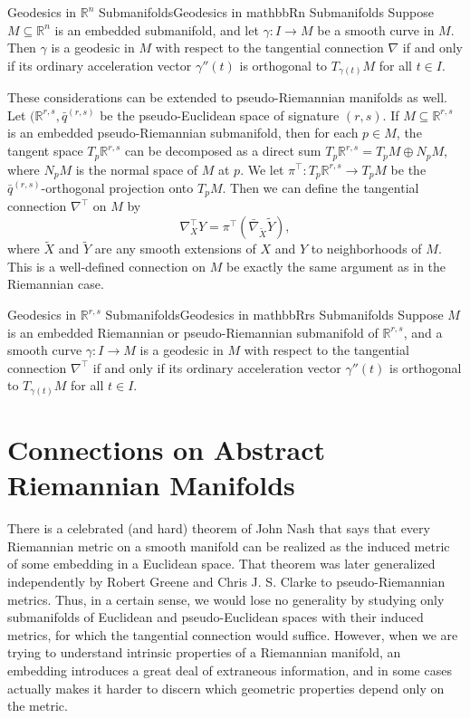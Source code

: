 \documentclass[../main.tex]{subfiles}
\begin{document}
\begin{proposition}{Geodesics in $\mathbb{R}^n$ Submanifolds}{Geodesics in mathbbRn Submanifolds}
	Suppose $M \subseteq \mathbb{R}^n$ is an embedded submanifold, and let $\gamma: I \to M$ be a smooth curve in $M$. Then $\gamma$ is a geodesic in $M$ with respect to the tangential connection $\nabla$ if and only if its ordinary acceleration vector $\gamma''(t)$ is orthogonal to $T_{\gamma(t)}M$ for all $t \in I$.
\end{proposition}

These considerations can be extended to pseudo-Riemannian manifolds as well. Let $(\mathbb{R}^{r,s}, \bar{q}^{(r,s)}$ be the pseudo-Euclidean space of signature $(r,s)$. If $M \subseteq \mathbb{R}^{r,s}$ is an embedded pseudo-Riemannian submanifold, then for each $p \in M$, the tangent space $T_p \mathbb{R}^{r,s}$ can be decomposed as a direct sum $T_p \mathbb{R}^{r,s} = T_p M \oplus N_p M$, where $N_p M$ is the normal space of $M$ at $p$. We let $\pi^\top: T_p \mathbb{R}^{r,s} \to T_p M$ be the $\bar{q}^{(r,s)}$-orthogonal projection onto $T_p M$. Then we can define the tangential connection $\nabla^{\top}$ on $M$ by
\begin{equation}
	\nabla^{\top}_X Y = \pi^\top(\bar{\nabla}_{\tilde{X}} \tilde{Y}),
\end{equation}
where $\tilde{X}$ and $\tilde{Y}$ are any smooth extensions of $X$ and $Y$ to neighborhoods of $M$. This is a well-defined connection on $M$ be exactly the same argument as in the Riemannian case.

\begin{proposition}{Geodesics in $\mathbb{R}^{r,s}$ Submanifolds}{Geodesics in mathbbRrs Submanifolds}
	Suppose $M$ is an embedded Riemannian or pseudo-Riemannian submanifold of $\mathbb{R}^{r,s}$, and a smooth curve $\gamma: I \to M$ is a geodesic in $M$ with respect to the tangential connection $\nabla^{\top}$ if and only if its ordinary acceleration vector $\gamma''(t)$ is orthogonal to $T_{\gamma(t)}M$ for all $t \in I$.
\end{proposition}

\section{Connections on Abstract Riemannian Manifolds}
\begin{remark}
	There is a celebrated (and hard) theorem of John Nash that says that every Riemannian metric on a smooth manifold can be realized as the induced metric of some embedding in a Euclidean space. That theorem was later generalized independently by Robert Greene and Chris J. S. Clarke to pseudo-Riemannian metrics. Thus, in a certain sense, we would lose no generality by studying only submanifolds of Euclidean and pseudo-Euclidean spaces with their induced metrics, for which the tangential connection would suffice. However, when we are trying to understand intrinsic properties of a Riemannian manifold, an embedding introduces a great deal of extraneous information, and in some cases actually makes it harder to discern which geometric properties depend only on the metric.
\end{remark}
\end{document}
